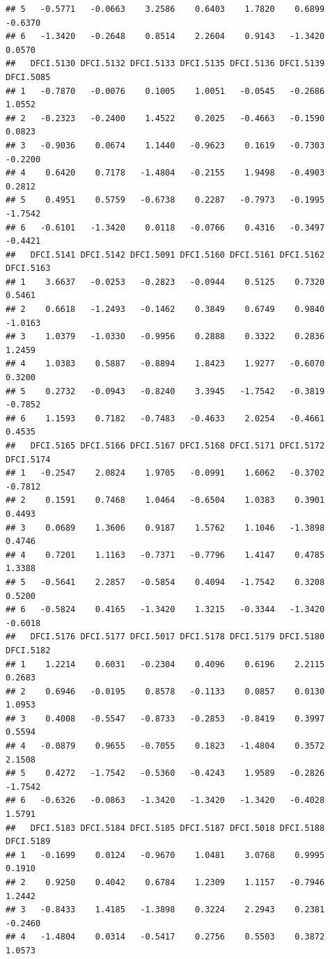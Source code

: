 \documentclass[
]{article}
\begin{document}
\begin{verbatim}
## 5   -0.5771   -0.0663    3.2586    0.6403    1.7820    0.6899   -0.6370
## 6   -1.3420   -0.2648    0.8514    2.2604    0.9143   -1.3420    0.0570
##   DFCI.5130 DFCI.5132 DFCI.5133 DFCI.5135 DFCI.5136 DFCI.5139 DFCI.5085
## 1   -0.7870   -0.0076    0.1005    1.0051   -0.0545   -0.2686    1.0552
## 2   -0.2323   -0.2400    1.4522    0.2025   -0.4663   -0.1590    0.0823
## 3   -0.9036    0.0674    1.1440   -0.9623    0.1619   -0.7303   -0.2200
## 4    0.6420    0.7178   -1.4804   -0.2155    1.9498   -0.4903    0.2812
## 5    0.4951    0.5759   -0.6738    0.2287   -0.7973   -0.1995   -1.7542
## 6   -0.6101   -1.3420    0.0118   -0.0766    0.4316   -0.3497   -0.4421
##   DFCI.5141 DFCI.5142 DFCI.5091 DFCI.5160 DFCI.5161 DFCI.5162 DFCI.5163
## 1    3.6637   -0.0253   -0.2823   -0.0944    0.5125    0.7320    0.5461
## 2    0.6618   -1.2493   -0.1462    0.3849    0.6749    0.9840   -1.0163
## 3    1.0379   -1.0330   -0.9956    0.2888    0.3322    0.2836    1.2459
## 4    1.0383    0.5887   -0.8894    1.8423    1.9277   -0.6070    0.3200
## 5    0.2732   -0.0943   -0.8240    3.3945   -1.7542   -0.3819   -0.7852
## 6    1.1593    0.7182   -0.7483   -0.4633    2.0254   -0.4661    0.4535
##   DFCI.5165 DFCI.5166 DFCI.5167 DFCI.5168 DFCI.5171 DFCI.5172 DFCI.5174
## 1   -0.2547    2.0824    1.9705   -0.0991    1.6062   -0.3702   -0.7812
## 2    0.1591    0.7468    1.0464   -0.6504    1.0383    0.3901    0.4493
## 3    0.0689    1.3606    0.9187    1.5762    1.1046   -1.3898    0.4746
## 4    0.7201    1.1163   -0.7371   -0.7796    1.4147    0.4785    1.3388
## 5   -0.5641    2.2857   -0.5854    0.4094   -1.7542    0.3208    0.5200
## 6   -0.5824    0.4165   -1.3420    1.3215   -0.3344   -1.3420   -0.6018
##   DFCI.5176 DFCI.5177 DFCI.5017 DFCI.5178 DFCI.5179 DFCI.5180 DFCI.5182
## 1    1.2214    0.6031   -0.2304    0.4096    0.6196    2.2115    0.2683
## 2    0.6946   -0.0195    0.8578   -0.1133    0.0857    0.0130    1.0953
## 3    0.4008   -0.5547   -0.8733   -0.2853   -0.8419    0.3997    0.5594
## 4   -0.0879    0.9655   -0.7055    0.1823   -1.4804    0.3572    2.1508
## 5    0.4272   -1.7542   -0.5360   -0.4243    1.9589   -0.2826   -1.7542
## 6   -0.6326   -0.0863   -1.3420   -1.3420   -1.3420   -0.4028    1.5791
##   DFCI.5183 DFCI.5184 DFCI.5185 DFCI.5187 DFCI.5018 DFCI.5188 DFCI.5189
## 1   -0.1699    0.0124   -0.9670    1.0481    3.0768    0.9995    0.1910
## 2    0.9250    0.4042    0.6784    1.2309    1.1157   -0.7946    1.2442
## 3   -0.8433    1.4185   -1.3898    0.3224    2.2943    0.2381   -0.2460
## 4   -1.4804    0.0314   -0.5417    0.2756    0.5503    0.3872    1.0573

\end{verbatim}
\end{document}
